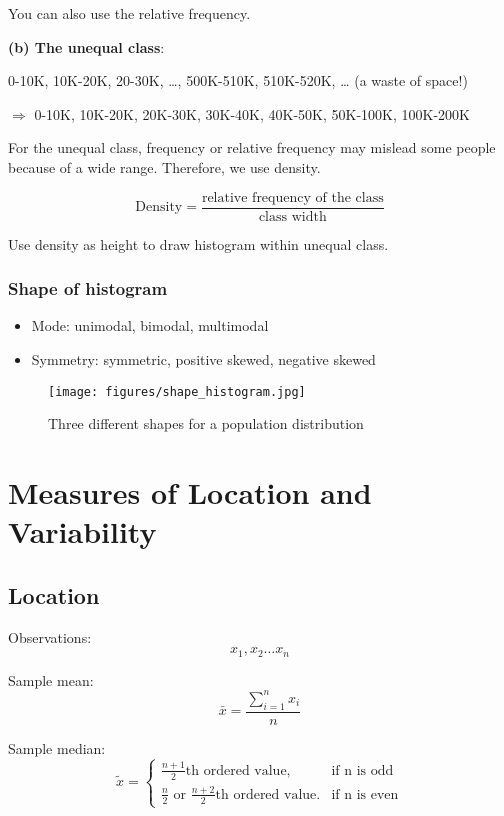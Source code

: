 You can also use the relative frequency.


\textbf{(b) The unequal class}:
\begin{exmp}
  0-10K, 10K-20K, 20-30K, \dots, 500K-510K, 510K-520K, \dots 
  (a waste of space!) 
  
  $\Rightarrow $  0-10K, 10K-20K, 20K-30K, 30K-40K, 40K-50K,  50K-100K, 100K-200K
\end{exmp}

For the unequal class, frequency or relative frequency may mislead some people because of a wide range. Therefore, we use density.

\[ \text{Density} = \frac{\text{relative frequency of the class}}{\text{class width}}	\]

Use density as height to draw histogram within unequal class.
\subsubsection{Shape of histogram}
\begin{itemize}
  \item Mode: unimodal, bimodal, multimodal
  \item Symmetry: symmetric, positive skewed, negative skewed
\end{itemize}

\begin{figure}[H]
\centering
\texttt{[image: figures/shape\_histogram.jpg]}
\caption{Three different shapes for a population distribution}
\label{fig:2}
\end{figure}

\section{Measures of Location and Variability}
\subsection{Location}

Observations: \[x_1,x_2 \dots x_n\]

Sample mean:
\[\bar{x}=\frac{\sum_{i=1}^{n} x_i}{n}\]

Sample median:
\[	\tilde{x}=\begin{cases}
\frac{n+1}{2}\text{th ordered value}, &\text{if n is odd}\\
\frac{n}{2}\text{ or }\frac{n+2}{2}\text{th ordered value}. &\text{if n is even}
\end{cases}	\]


